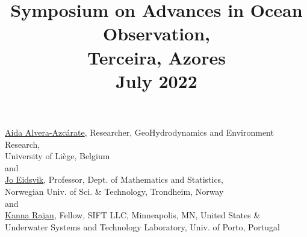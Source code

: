 \documentclass[12pt,letterpaper]{article}
\title{Symposium on Advances in Ocean Observation,\\
  Terceira, Azores\\ \large{\textbf{July 2022}}}
\date{}
\begin{document}
\maketitle{}

\vspace{-1.75cm}
\begin{center}
   \href{http://modb.oce.ulg.ac.be/mediawiki/index.php/User:Aida}{\textsf{Aida Alvera-Azc\'{a}rate}},
  Researcher, GeoHydrodynamics and Environment Research,\\
  University of Li\`{e}ge, Belgium\\
  and\\
  \href{https://www.ntnu.edu/employees/jo.eidsvik}{\textsf{Jo Eidsvik}},
  Professor, Dept. of Mathematics and Statistics, \\Norwegian Univ. of
  Sci. \& Technology, Trondheim, Norway\\
  and\\
  \href{https://kanna.rajan.systems}{\textsf{Kanna Rajan}},
  Fellow, SIFT LLC, Minneapolis, MN, United States \& \\Underwater Systems and Technology
  Laboratory, Univ. of Porto, Portugal\\
\end{center}





\newpage


\renewcommand{\thepage}{}
\end{document}
